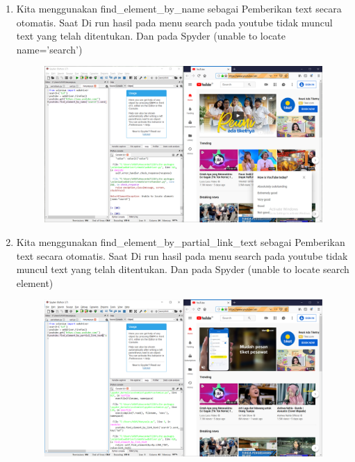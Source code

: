 \begin{enumerate}
    \item Kita menggunakan find\_element\_by\_name sebagai Pemberikan text secara otomatis. Saat  Di run hasil pada menu search pada youtube tidak muncul text yang telah ditentukan. Dan pada Spyder {(unable to locate name='search')}
\begin{figure}[!htbp]
    \centering
    \includegraphics[scale=0.3]{figure/hasilTes/5.png}
    \label{gambar 1}
\end{figure}

    \item Kita menggunakan find\_element\_by\_partial\_link\_text sebagai Pemberikan text secara otomatis. Saat  Di run hasil pada menu search pada youtube tidak muncul text yang telah ditentukan. Dan pada Spyder {(unable to locate search element)}
\begin{figure}[!htbp]
    \centering
    \includegraphics[scale=0.3]{figure/hasilTes/6.png}
    \label{gambar 1}
\end{figure}

\vspace{3cm}


\end{enumerate}
